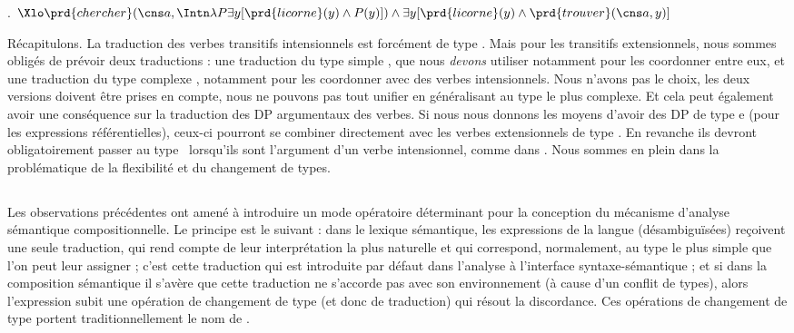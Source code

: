 \fussy

\ex.
\(\Xlo\prd{chercher}(\cns a,\Intn\lambda P\exists y[\prd{licorne}(y)\wedge P(y)]) \wedge \exists y[\prd{licorne}(y) \wedge \prd{trouver}(\cns a,y)]\)


\sloppy

Récapitulons.  La traduction des verbes transitifs intensionnels est forcément de type .  Mais pour les transitifs extensionnels, nous sommes obligés de prévoir deux traductions : une traduction du type simple \eet, que nous \emph{devons} utiliser notamment pour les coordonner entre eux, et une traduction du type complexe , notamment pour les coordonner avec des verbes intensionnels.  Nous n'avons pas le choix, les deux versions doivent être prises en compte, nous ne pouvons pas tout unifier en généralisant au type le plus complexe.
Et cela peut également avoir une conséquence sur la traduction des DP argumentaux des verbes.  Si nous nous donnons les moyens d'avoir des DP de type \typ e (pour les expressions référentielles), ceux-ci pourront se combiner directement avec les verbes extensionnels de type \eet.  En revanche ils devront obligatoirement passer au type \ett\ lorsqu'ils sont l'argument d'un verbe intensionnel, comme dans . 
Nous sommes en plein dans la problématique de la flexibilité et du changement de types.

\fussy




\subsection{}

Les observations précédentes ont amené 
\citet{PartRooth:83}
à introduire un mode opératoire déterminant pour la conception du  mécanisme d'analyse sémantique compositionnelle.  
Le principe est le suivant : dans le lexique sémantique, les expressions de la langue (désambiguïsées) reçoivent une seule traduction, qui rend compte de leur interprétation la plus naturelle et qui correspond, normalement, au type le plus simple que l'on peut leur assigner ; c'est cette traduction qui est introduite par défaut dans l'analyse à l'interface syntaxe-sémantique ; et si dans la composition sémantique il s'avère que cette traduction ne s'accorde pas avec son environnement (à cause d'un conflit de types), alors l'expression subit une opération de changement de type (et donc de traduction) qui résout la discordance.
Ces opérations de changement de type portent traditionnellement  le nom de .

